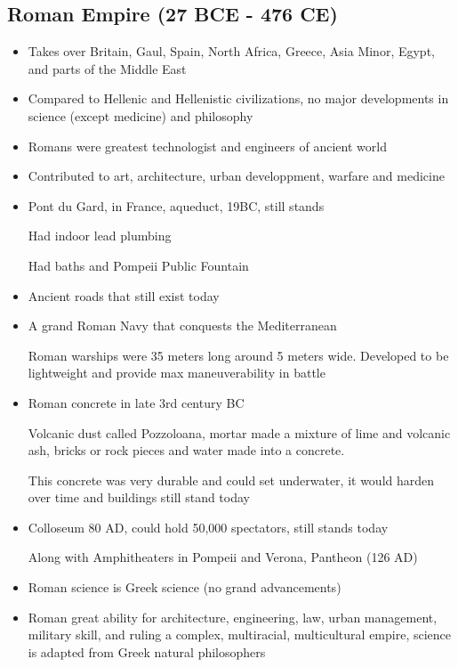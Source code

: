 \documentclass{article}
\begin{document}
\subsection{Roman Empire (27 BCE - 476 CE)}
\begin{itemize}
  \item Takes over Britain, Gaul, Spain, North Africa, Greece, Asia Minor,
    Egypt, and parts of the Middle East
  \item Compared to Hellenic and Hellenistic civilizations, no major
    developments in science (except medicine) and philosophy
  \item Romans were greatest technologist and engineers of ancient world
  \item Contributed to art, architecture, urban developpment, warfare and medicine
  \item Pont du Gard, in France, aqueduct, 19BC, still stands

    Had indoor lead plumbing

    Had baths and Pompeii Public Fountain
  \item Ancient roads that still exist today
  \item A grand Roman Navy that conquests the Mediterranean

    Roman warships were 35 meters long around 5 meters wide.
    Developed to be lightweight and provide max maneuverability in battle
  \item Roman concrete in late 3rd century BC

    Volcanic dust called Pozzoloana, mortar made a mixture of lime and volcanic ash,
    bricks or rock pieces and water made into a concrete.

    This concrete was very durable and could set underwater,
    it would harden over time and buildings still stand today
  \item Colloseum 80 AD, could hold 50,000 spectators, still stands today

    Along with Amphitheaters in Pompeii and Verona, Pantheon (126 AD)
  \item Roman science is Greek science (no grand advancements)
  \item Roman great ability for architecture, engineering, law, urban management, military skill,
    and ruling a complex, multiracial, multicultural empire, science is
    adapted from Greek natural philosophers
\end{itemize}
\end{document}

